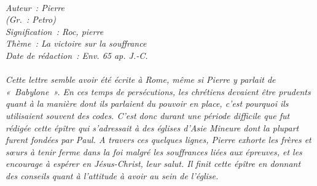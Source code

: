 \BFont
\noindent\hrulefill
{\footnotesize
\textit{
\bigskip
{\centering{}
\\Auteur~: Pierre
\\(Gr.~: Petro)
\\Signification~: Roc, pierre
\\Thème~: La victoire sur la souffrance
\\Date de rédaction~: Env. 65 ap. J.-C.\\}
}
\textit{
\\Cette lettre semble avoir été écrite à Rome, même si Pierre y parlait de «~Babylone~». En ces temps de persécutions, les chrétiens devaient être prudents quant à la manière dont ils parlaient du pouvoir en place, c'est pourquoi ils utilisaient souvent des codes. C'est donc durant une période difficile que fut rédigée cette épître qui s'adressait à des églises d'Asie Mineure dont la plupart furent fondées par Paul. A travers ces quelques lignes, Pierre exhorte les frères et sœurs à tenir ferme dans la foi malgré les souffrances liées aux épreuves, et les encourage à espérer en Jésus-Christ, leur salut. Il finit cette épître en donnant des conseils quant à l'attitude à avoir au sein de l'église.\bigskip
}
}
\par\nobreak\noindent\hrulefill
